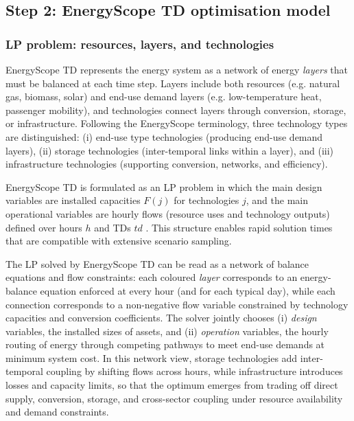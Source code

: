 \documentclass{article}
\begin{document}
\subsection{Step 2: EnergyScope TD optimisation model}

\subsubsection{LP problem: resources, layers, and technologies}
EnergyScope TD represents the energy system as a network of energy \emph{layers} that must be balanced at each time step. Layers include both resources (e.g. natural gas, biomass, solar) and end-use demand layers (e.g. low-temperature heat, passenger mobility), and technologies connect layers through conversion, storage, or infrastructure. Following the EnergyScope terminology, three technology types are distinguished:
(i) end-use type technologies (producing end-use demand layers),
(ii) storage technologies (inter-temporal links within a layer),
and (iii) infrastructure technologies (supporting conversion, networks, and efficiency).

EnergyScope TD is formulated as an LP problem in which the main design variables are installed capacities $F(j)$ for technologies $j$, and the main operational variables are hourly flows (resource uses and technology outputs) defined over hours $h$ and TDs $td$ \citep{limpensGeneratingEnergyTransition2021}. This structure enables rapid solution times that are compatible with extensive scenario sampling. 


The LP solved by EnergyScope TD can be read as a network of balance equations and flow constraints: each coloured \emph{layer} corresponds to an energy-balance equation enforced at every hour (and for each typical day), while each connection corresponds to a non-negative flow variable constrained by technology capacities and conversion coefficients. The solver jointly chooses (i) \emph{design} variables, the installed sizes of assets, and (ii) \emph{operation} variables, the hourly routing of energy through competing pathways to meet end-use demands at minimum system cost. In this network view, storage technologies add inter-temporal coupling by shifting flows across hours, while infrastructure introduces losses and capacity limits, so that the optimum emerges from trading off direct supply, conversion, storage, and cross-sector coupling under resource availability and demand constraints.
\end{document}
